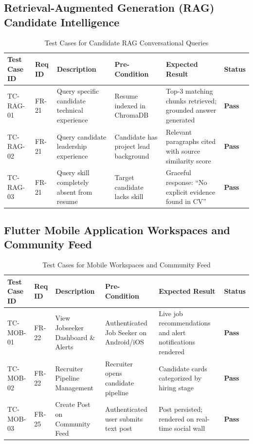\subsection{Retrieval-Augmented Generation (RAG) Candidate Intelligence}
\begin{table}[h!]
\centering
\small
\caption{Test Cases for Candidate RAG Conversational Queries}
\label{tab:tc_rag}
\begin{tabular}{|p{2.2cm}|p{1.4cm}|p{3.4cm}|p{2.8cm}|p{3.2cm}|p{1cm}|}
\hline
\textbf{Test Case ID} & \textbf{Req ID} & \textbf{Description} & \textbf{Pre-Condition} & \textbf{Expected Result} & \textbf{Status} \\ \hline
TC-RAG-01 & FR-21 & Query specific candidate technical experience & Resume indexed in ChromaDB & Top-3 matching chunks retrieved; grounded answer generated & \textbf{Pass} \\ \hline
TC-RAG-02 & FR-21 & Query candidate leadership experience & Candidate has project lead background & Relevant paragraphs cited with source similarity score & \textbf{Pass} \\ \hline
TC-RAG-03 & FR-21 & Query skill completely absent from resume & Target candidate lacks skill & Graceful response: ``No explicit evidence found in CV'' & \textbf{Pass} \\ \hline
\end{tabular}
\end{table}

\subsection{Flutter Mobile Application Workspaces and Community Feed}
\begin{table}[h!]
\centering
\small
\caption{Test Cases for Mobile Workspaces and Community Feed}
\label{tab:tc_mobile}
\begin{tabular}{|p{2.2cm}|p{1.4cm}|p{3.4cm}|p{2.8cm}|p{3.2cm}|p{1cm}|}
\hline
\textbf{Test Case ID} & \textbf{Req ID} & \textbf{Description} & \textbf{Pre-Condition} & \textbf{Expected Result} & \textbf{Status} \\ \hline
TC-MOB-01 & FR-22 & View Jobseeker Dashboard \& Alerts & Authenticated Job Seeker on Android/iOS & Live job recommendations and alert notifications rendered & \textbf{Pass} \\ \hline
TC-MOB-02 & FR-22 & Recruiter Pipeline Management & Recruiter opens candidate pipeline & Candidate cards categorized by hiring stage & \textbf{Pass} \\ \hline
TC-MOB-03 & FR-25 & Create Post on Community Feed & Authenticated user submits text post & Post persisted; rendered on real-time social wall & \textbf{Pass} \\ \hline
\end{tabular}
\end{table}

